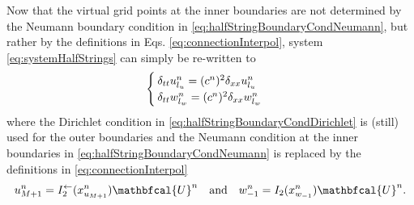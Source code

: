 \SWcomment[***$\rightarrow$]Now that the virtual grid points at the inner boundaries are not determined by the Neumann boundary condition in \eqref{eq:halfStringBoundaryCondNeumann}, but rather by the definitions in Eqs. \eqref{eq:connectionInterpol}, system \eqref{eq:systemHalfStrings} can simply be re-written to
\begin{equation}\label{eq:FDSwithMethod}
    \begin{cases}
        \delta_{tt}u_{l_u}^n = (c^n)^2\delta_{xx}u_{l_u}^n\\
        \delta_{tt}w_{l_w}^n = (c^n)^2\delta_{xx}w_{l_w}^n
    \end{cases}
\end{equation}
where the Dirichlet condition in \eqref{eq:halfStringBoundaryCondDirichlet} is (still) used for the outer boundaries and the Neumann condition at the inner boundaries in \eqref{eq:halfStringBoundaryCondNeumann} is replaced by the definitions in \eqref{eq:connectionInterpol}
\begin{equation}
        u_{M+1}^n = I_2^\flip(x_{u_{M+1}}^n)\mathbfcal{U}^n \quad \text{and}\quad w_{-1}^n = I_2(x_{w_{-1}}^n)\mathbfcal{U}^n.
\end{equation}
\SWcomment[$\leftarrow$***]

